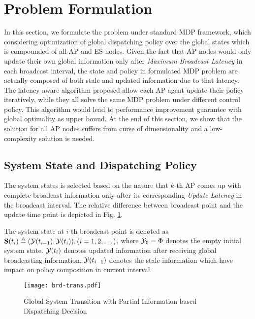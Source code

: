 \section{Problem Formulation}
In this section, we formulate the problem under standard MDP framework, which considering optimization of global dispatching policy over the global states which is compounded of all AP and ES nodes.
Given the fact that AP nodes would only update their own global information only after \emph{Maximum Broadcast Latency} in each broadcast interval, the state and policy in formulated MDP problem are actually composed of both stale and updated information due to that latency.
The latency-aware algorithm proposed allow each AP agent update their policy iteratively, while they all solve the same MDP problem under different control policy. This algorithm would lead to performance improvement guarantee with global optimality as upper bound.
At the end of this section, we show that the solution for all AP nodes suffers from curse of dimensionality and a low-complexity solution is needed.

\subsection{System State and Dispatching Policy}
The system states is selected based on the nature that $k$-th AP comes up with complete broadcast information only after its corresponding \emph{Update Latency} in the broadcast interval.
The relative difference between broadcast point and the update time point is depicted in Fig. \ref{fig:brd-trans}.
\begin{definition}
    The system state at $i$-th broadcast point is denoted as
    $\mathbf{S}(t_i) \triangleq (\mathcal{Y}(t_{i-1}), \mathcal{Y}(t_{i})), (i=1,2,\dots)$,
    where $\mathcal{Y}_{0} =\Phi$ denotes the empty initial system state.
    $\mathcal{Y}(t_{i})$ denotes updated information after receiving global broadcasting information, $\mathcal{Y}(t_{i-1})$ denotes the stale information which have impact on policy composition in current interval.
\end{definition}

\begin{figure}[ht]
    \centering
    \texttt{[image: brd-trans.pdf]}
    \caption{Global System Transition with Partial Information-based Dispatching Decision}
    \label{fig:brd-trans}
\end{figure}

